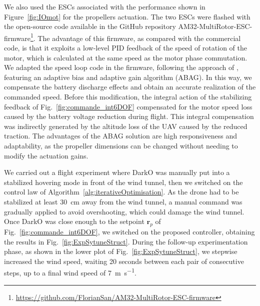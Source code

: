 We also used the ESCs associated with the performance shown in Figure~\ref{fig:IOmot} for the propellers actuation. The two ESCs were flashed with the open-source code available in the GitHub repository AM32-MultiRotor-ESC-firmware\footnote{\url{https://github.com/FlorianSan/AM32-MultiRotor-ESC-firmware}}. The advantage of this firmware, as compared with the commercial code, is that it exploits a low-level PID feedback of the speed of rotation of the motor, which is calculated at the same speed as the motor phase commutation. We adapted the speed loop code in the firmware, following the approach of \cite{franchi2017}, featuring an adaptive bias and adaptive gain algorithm (ABAG). In this way, we compensate the battery discharge effects and obtain an accurate realization of the commanded speed. Before this modification, the integral action of the stabilizing feedback of Fig.~\ref{fig:commande_int6DOF} compensated for the motor speed loss caused by the battery voltage reduction during flight. This integral compensation was indirectly generated by the altitude loss of the UAV caused by the reduced traction. The advantages of the ABAG solution are high responsiveness and adaptability, as the propeller dimensions can be changed without needing to modify the actuation gains.

We carried out a flight experiment where DarkO was manually put into a stabilized hovering mode in front of the wind tunnel, then we switched on the control law of Algorithm~\ref{alg:iterativeOptimisation}. As the drone had to be stabilized at least \SI{30}{\centi\meter} away from the wind tunnel, a manual command was gradually applied to avoid overshooting, which could damage the wind tunnel. Once DarkO was close enough to the setpoint $\boldsymbol{r}_{p}$ of Fig.~\ref{fig:commande_int6DOF}, we switched on the proposed controller, obtaining the results in Fig.~\ref{fig:ExpSytuneStruct}. During the follow-up experimentation phase, as shown in the lower plot of Fig.~\ref{fig:ExpSytuneStruct}, we stepwise increased the wind speed, waiting 20 seconds between each  pair of consecutive steps, up to a final wind speed of \SI{7}{\meter\per\second}.


